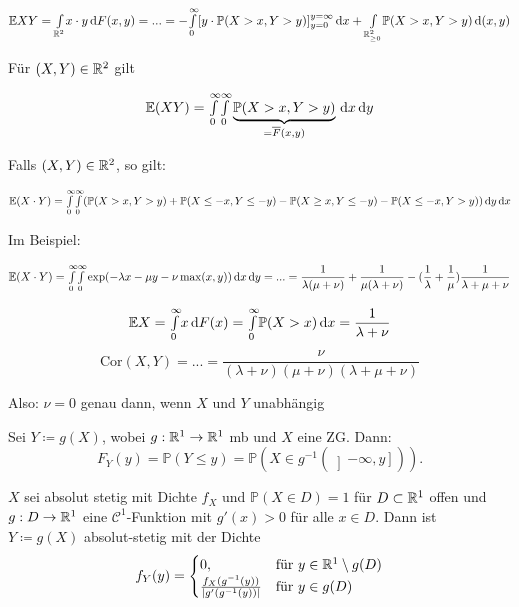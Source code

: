 \documentclass{cheat-sheet}
\renewcommand{\P}{\mathbb{P}} %
\newcommand{\E}{\mathbb{E}} %
\newcommand{\cor}{\mathrm{Cor}} %
\begin{document}
  \[ \E XY = \Int{\R^2}{}{x \cdot y}{F(x,y)} = ... = - \Int{0}{\infty}{[y \cdot \P(X > x, Y > y)]_{y=0}^{y=\infty}}{x} + \Int{\R_{\geq 0}^2}{}{\P(X > x, Y > y)}{(x,y)} \]

  Für $(X, Y) \in \mathbb{R}^2$ gilt

  \[ \E (XY) = \Int{0}{\infty}{\Int{0}{\infty}{\underbrace{\P(X > x, Y > y)}_{= \overline{F}(x,y)}}{x}}{y} \]

  Falls $(X, Y) \in \mathbb{R}^2$, so gilt:

  \[ \E (X \cdot Y) = \Int{0}{\infty}{\Int{0}{\infty}{(\P(X > x, Y > y) + \P(X \leq -x, Y \leq -y) - \P(X \geq x, Y \leq -y) - \P(X \leq -x, Y > y))}{y}}{x} \]

  Im Beispiel:

  \[ \E (X \cdot Y) = \Int{0}{\infty}{\Int{0}{\infty}{\exp(-\lambda x - \mu y - \nu \max(x,y))}{x}}{y} = ... = \frac{1}{\lambda (\mu + \nu)} + \frac{1}{\mu (\lambda + \nu)} - (\frac{1}{\lambda} + \frac{1}{\mu}) \frac{1}{\lambda + \mu + \nu} \]

  \[ \E X = \Int{0}{\infty}{x}{F(x)} = \Int{0}{\infty}{\P(X > x)}{x} = \frac{1}{\lambda + \nu} \]
  \[ \cor(X,Y) = ... = \frac{\nu}{(\lambda + \nu) (\mu + \nu) (\lambda + \mu + \nu)} \]

  Also: $\nu = 0$ genau dann, wenn $X$ und $Y$ unabhängig
\fi



\begin{satz}
  Sei $Y \coloneqq g(X)$, wobei $g : \mathbb{R}^1 \to \mathbb{R}^1$ mb und $X$ eine ZG. Dann:
  \[ F_Y(y) = \P(Y \leq y) = \P(X \in g^{-1}(\left] -\infty, y \right])). \]
\end{satz}

\iffalse
  \[ F_Y(y) = \P(Y \leq y) = \P(Y \in \left] -\infty, y \right[) = \P(X \in g^{-1}(\left] -\infty, y \right])) \]

  Beispiel: $Y = X^2$, $y \geq 0$

  $F_Y(y) = \P(X^2 \leq y) = \P(\abs{X} \leq \sqrt{y}) = \P(-\sqrt{y} \leq X \leq \sqrt{y}) = \P(X = -\sqrt{y}) + F_X(\sqrt{y}) - F_X(-\sqrt{y}) = F_X(\sqrt{y}) - \lim_{z \uparrow -\sqrt{y}} F_X(z)$
\fi

\begin{satz}
  $X$ sei absolut stetig mit Dichte $f_X$ und $\P(X \in D) = 1$ für $D \subset \mathbb{R}^1$ offen und $g : D \to \mathbb{R}^1$ eine $\mathcal{C}^1$-Funktion mit $g'(x) > 0$ für alle $x \in D$. Dann ist $Y \coloneqq g(X)$ absolut-stetig mit der Dichte
  \[
    f_Y(y) = \begin{cases}
      0, & \text{für } y \in \mathbb{R}^1 \setminus g(D) \\
      \tfrac{f_X(g^{-1}(y))}{\lvert g'(g^{-1}(y))\rvert} & \text{für } y \in g(D)
    \end{cases}
  \]
\end{satz}
\end{document}

